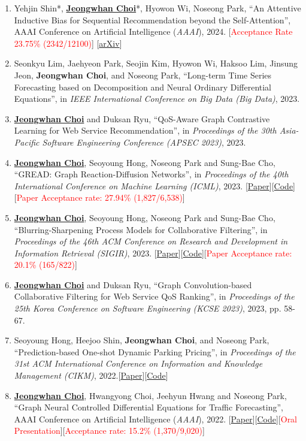 \documentclass[10pt]{article}
\newenvironment{changemargin}[2]{
  \begin{list}{}{
    \setlength{\topsep}{0pt}
    \setlength{\leftmargin}{#1}
    \setlength{\rightmargin}{#2}
    \setlength{\listparindent}{\parindent}
    \setlength{\itemindent}{\parindent}
    \setlength{\parsep}{\parskip}
  }
  \item[]}{\end{list}
}
\newcommand{\RED}[1]{\textcolor{red}{#1}}
\newcommand{\textbu}[1]{\underline{\textbf{#1}}}
\newenvironment{body} {
	\vspace*{-16pt}
	\begin{changemargin}{-0.25in}{-0.5in}
  }
	{\end{changemargin}
}
\begin{document}
\begin{body}
\begin{enumerate}
    \item Yehjin Shin*, \textbu{Jeongwhan Choi}*, Hyowon Wi, Noseong Park, ``An Attentive Inductive Bias for Sequential Recommendation beyond the Self-Attention'', AAAI Conference on Artificial Intelligence (\textit{AAAI}), 2024. [\RED{Acceptance Rate 23.75\% (2342/12100)}] [\href{https://arxiv.org/abs/2312.10325}{arXiv}]
    \item Seonkyu Lim, Jaehyeon Park, Seojin Kim, Hyowon Wi, Haksoo Lim, Jinsung Jeon, \textbf{Jeongwhan Choi}, and Noseong Park, ``Long-term Time Series Forecasting based on Decomposition and Neural Ordinary Differential Equations'', in \emph{IEEE International Conference on Big Data (Big Data)}, 2023.
    \item \textbu{Jeongwhan Choi} and Duksan Ryu, ``QoS-Aware Graph Contrastive Learning for Web Service Recommendation'', in \emph{Proceedings of the 30th Asia-Pacific Software Engineering Conference (APSEC 2023)}, 2023.
    \item \textbu{Jeongwhan Choi}, Seoyoung Hong, Noseong Park and Sung-Bae Cho, ``GREAD: Graph Reaction-Diffusion Networks'', in \emph{Proceedings of the 40th International Conference on Machine Learning (ICML)}, 2023. [\href{http://proceedings.mlr.press/v202/choi23a}{Paper}][\href{https://github.com/jeongwhanchoi/GREAD}{Code}][\RED{Paper Acceptance rate: 27.94\% (1,827/6,538)}]
    \item \textbu{Jeongwhan Choi}, Seoyoung Hong, Noseong Park and Sung-Bae Cho, ``Blurring-Sharpening Process Models for Collaborative Filtering'', in \emph{Proceedings of the 46th ACM Conference on Research and Development in Information Retrieval (SIGIR)}, 2023. [\href{https://arxiv.org/abs/2211.09324}{Paper}][\href{https://github.com/jeongwhanchoi/bspm}{Code}][\RED{Paper Acceptance rate: 20.1\% (165/822)}]
    \item \textbu{Jeongwhan Choi} and Duksan Ryu, ``Graph Convolution-based Collaborative Filtering for Web Service QoS Ranking'', in \emph{Proceedings of the 25th Korea Conference on Software Engineering (KCSE 2023)}, 2023, pp. 58-67.
    \item Seoyoung Hong, Heejoo Shin, \textbf{Jeongwhan Choi}, and Noseong Park, ``Prediction-based One-shot Dynamic Parking Pricing'', in \emph{Proceedings of the 31st ACM International Conference on Information and Knowledge Management (CIKM)}, 2022.[\href{https://arxiv.org/abs/2208.14231}{Paper}][\href{https://github.com/jeongwhanchoi/one-shot-optimization}{Code}]
    \item \textbu{Jeongwhan Choi}, Hwangyong Choi, Jeehyun Hwang and Noseong Park, ``Graph Neural Controlled Differential Equations for Traffic Forecasting'', AAAI Conference on Artificial Intelligence (\textit{AAAI}), 2022. [\href{https://ojs.aaai.org/index.php/AAAI/article/download/20587/20346}{Paper}][\href{https://github.com/jeongwhanchoi/STG-NCDE}{Code}][\RED{Oral Presentation}][\RED{Acceptance rate: 15.2\% (1,370/9,020)}]

\end{enumerate}
\end{body}
\end{document}
